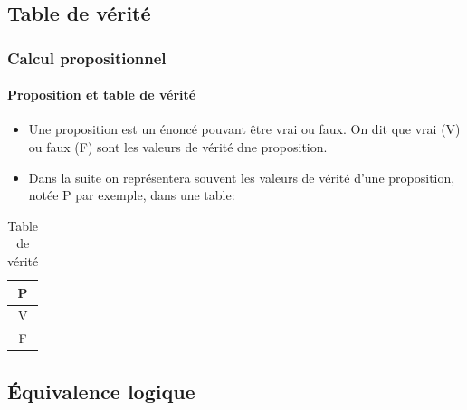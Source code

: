 \documentclass[10pt,notheorems]{beamer}
\theoremstyle{plain}
\theoremstyle{definition} %
\begin{document}
\subsection{Table de vérité}

\begin{frame}
  \frametitle{Calcul propositionnel}
  \framesubtitle{Proposition et table de vérité}

  \begin{itemize}

  \item Une proposition est un énoncé pouvant être vrai ou faux. On
    dit que vrai (V) ou faux (F) sont les valeurs de vérité dne
    proposition.\newline

  \item Dans la suite on représentera souvent les valeurs de vérité
    d'une proposition, notée P par exemple, dans une table:

  \end{itemize}

  \begin{table}[H]
    \centering
    \begin{tabular}[H]{|c|}
      \hline
      P \\ \hline
      V \\
      F \\
      \hline\hline
    \end{tabular}
    \caption{Table de vérité}
    \label{tab:verite}
  \end{table}

\end{frame}

\subsection{Équivalence logique}
\end{document}
